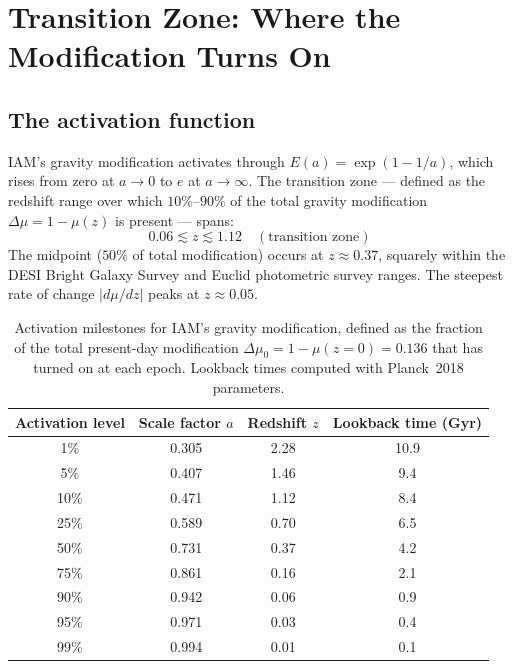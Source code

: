 \documentclass[12pt,a4paper]{article}
\begin{document}
\section{Transition Zone: Where the Modification Turns On}

\subsection{The activation function}

IAM's gravity modification activates through $E(a) = \exp(1-1/a)$, which rises
from zero at $a \to 0$ to $e$ at $a \to \infty$. The transition zone --- defined
as the redshift range over which $10\%$--$90\%$ of the total gravity modification
$\Delta\mu = 1 - \mu(z)$ is present --- spans:
\begin{equation}
0.06 \lesssim z \lesssim 1.12 \quad (\text{transition zone})
\end{equation}
The midpoint ($50\%$ of total modification) occurs at $z \approx 0.37$, squarely
within the DESI Bright Galaxy Survey and Euclid photometric survey ranges. The
steepest rate of change $|d\mu/dz|$ peaks at $z \approx 0.05$.

\begin{table}[h]
\centering
\caption{Activation milestones for IAM's gravity modification, defined as the
fraction of the total present-day modification $\Delta\mu_0 = 1 - \mu(z=0) =
0.136$ that has turned on at each epoch. Lookback times computed with
Planck~2018 parameters.}
\label{tab:activation}
\begin{tabular}{cccc}
\toprule
Activation level & Scale factor $a$ & Redshift $z$ & Lookback time (Gyr) \\
\midrule
1\%  & 0.305 & 2.28 & 10.9 \\
5\%  & 0.407 & 1.46 &  9.4 \\
10\% & 0.471 & 1.12 &  8.4 \\
25\% & 0.589 & 0.70 &  6.5 \\
50\% & 0.731 & 0.37 &  4.2 \\
75\% & 0.861 & 0.16 &  2.1 \\
90\% & 0.942 & 0.06 &  0.9 \\
95\% & 0.971 & 0.03 &  0.4 \\
99\% & 0.994 & 0.01 &  0.1 \\
\bottomrule
\end{tabular}
\end{table}
\end{document}
